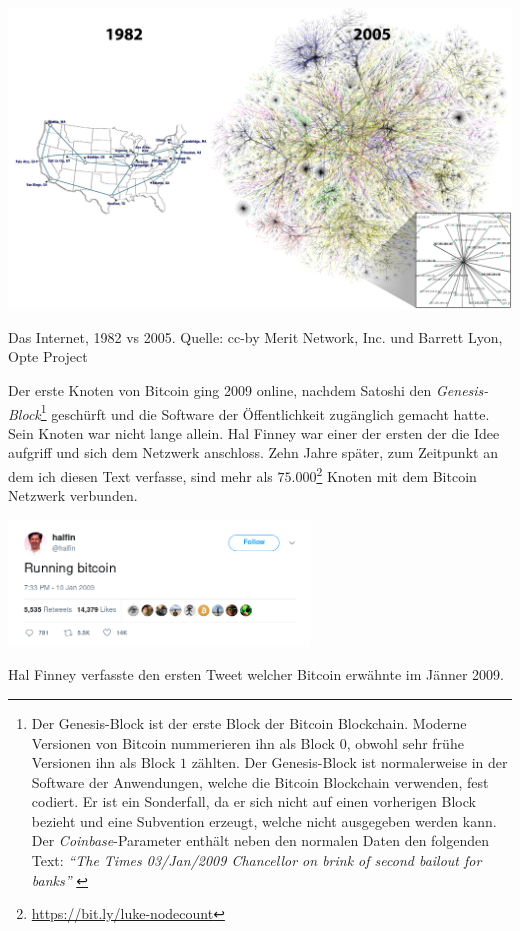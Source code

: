 \begin{center}
  \includegraphics[width=\textwidth]{assets/images/internet-evolution-white-dates.png}
  \caption{Das Internet, 1982 vs 2005. Quelle: cc-by Merit Network, Inc. und
  Barrett Lyon, Opte Project}
  \label{fig:internet-evolution-white-dates}
\end{center}

Der erste Knoten von Bitcoin ging 2009 online, nachdem Satoshi den
\textit{Genesis-Block}\footnote{ Der Genesis-Block ist der erste Block der
Bitcoin Blockchain. Moderne Versionen von Bitcoin nummerieren ihn als Block $0$,
obwohl sehr frühe Versionen ihn als Block $1$ zählten. Der Genesis-Block ist
normalerweise in der Software der Anwendungen, welche die Bitcoin Blockchain
verwenden, fest codiert.  Er ist ein Sonderfall, da er sich nicht auf einen
vorherigen Block bezieht und eine Subvention erzeugt, welche nicht ausgegeben
werden kann. Der \textit{Coinbase}-Parameter enthält neben den normalen Daten
den folgenden Text: \textit{\enquote{The Times 03/Jan/2009 Chancellor on brink
of second bailout for banks}} \cite{btcwiki:genesis-block}} geschürft und die
Software der Öffentlichkeit zugänglich gemacht hatte. Sein Knoten war nicht
lange allein. Hal Finney war einer der ersten der die Idee aufgriff und
sich dem Netzwerk anschloss. Zehn Jahre später, zum Zeitpunkt an dem ich diesen
Text verfasse, sind mehr als
$75.000$\footnote{\url{https://bit.ly/luke-nodecount}} Knoten mit dem Bitcoin
Netzwerk verbunden.

\begin{center}
  \centering
  \includegraphics[width=8cm]{assets/images/running-bitcoin.png}
  \caption{Hal Finney verfasste den ersten Tweet welcher Bitcoin erwähnte im
  Jänner 2009.}
  \label{fig:running-bitcoin}
\end{center}

